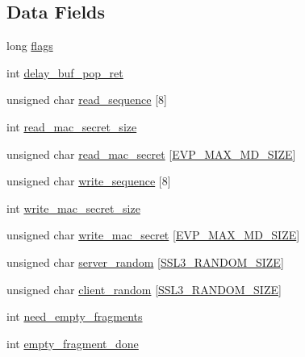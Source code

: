\subsection*{Data Fields}
\begin{DoxyCompactItemize}
\item 
long \hyperlink{structssl3__state__st_a6a36e81b5744ff152979cae202d37e78}{flags}
\item 
int \hyperlink{structssl3__state__st_a366e9e32766c142f2bdc7d57725d40ed}{delay\+\_\+buf\+\_\+pop\+\_\+ret}
\item 
unsigned char \hyperlink{structssl3__state__st_a194a4eb94f5fa828f31763ea9d76d077}{read\+\_\+sequence} \mbox{[}8\mbox{]}
\item 
int \hyperlink{structssl3__state__st_a99dcbbc34678c50eb7e4548f4f8bb5ee}{read\+\_\+mac\+\_\+secret\+\_\+size}
\item 
unsigned char \hyperlink{structssl3__state__st_a1c0a6b7139bf4a5648f15efe73b53926}{read\+\_\+mac\+\_\+secret} \mbox{[}\hyperlink{include_2openssl_2evp_8h_a71bfc78a168f00f0c4ffd2535082b129}{E\+V\+P\+\_\+\+M\+A\+X\+\_\+\+M\+D\+\_\+\+S\+I\+ZE}\mbox{]}
\item 
unsigned char \hyperlink{structssl3__state__st_a8e595b1f86395ec64caff077bd42ac46}{write\+\_\+sequence} \mbox{[}8\mbox{]}
\item 
int \hyperlink{structssl3__state__st_a14d2ba8072e79e13a943802bfd7e258c}{write\+\_\+mac\+\_\+secret\+\_\+size}
\item 
unsigned char \hyperlink{structssl3__state__st_ab1676846276e47ca205bcb763af27ad5}{write\+\_\+mac\+\_\+secret} \mbox{[}\hyperlink{include_2openssl_2evp_8h_a71bfc78a168f00f0c4ffd2535082b129}{E\+V\+P\+\_\+\+M\+A\+X\+\_\+\+M\+D\+\_\+\+S\+I\+ZE}\mbox{]}
\item 
unsigned char \hyperlink{structssl3__state__st_aae9fd9ecc822164fa20b6132861cf4fd}{server\+\_\+random} \mbox{[}\hyperlink{ssl_2ssl3_8h_a359c4c2030a5af4ab2c0ebd10766b53e}{S\+S\+L3\+\_\+\+R\+A\+N\+D\+O\+M\+\_\+\+S\+I\+ZE}\mbox{]}
\item 
unsigned char \hyperlink{structssl3__state__st_a792c197a2dc6ba43d8ca28bedc34705e}{client\+\_\+random} \mbox{[}\hyperlink{ssl_2ssl3_8h_a359c4c2030a5af4ab2c0ebd10766b53e}{S\+S\+L3\+\_\+\+R\+A\+N\+D\+O\+M\+\_\+\+S\+I\+ZE}\mbox{]}
\item 
int \hyperlink{structssl3__state__st_ab27e4c9269acfcf3750190c207f49304}{need\+\_\+empty\+\_\+fragments}
\item 
int \hyperlink{structssl3__state__st_a4f544645e90d1cf24579d8bdac8bd5a7}{empty\+\_\+fragment\+\_\+done}

\end{DoxyCompactItemize}
